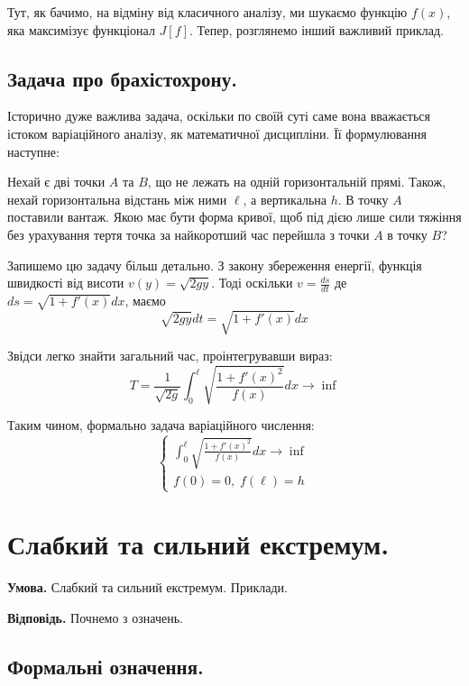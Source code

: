 \documentclass[14pt]{extarticle}
\newcommand{\<}{\langle}
\renewcommand{\>}{\rangle}
\theoremstyle{mystyle}{\newtheorem{definition}{Definition}[section]}
\theoremstyle{mystyle}{\newtheorem{proposition}[definition]{Proposition}}
\theoremstyle{mystyle}{\newtheorem{theorem}[definition]{Theorem}}
\theoremstyle{mystyle}{\newtheorem{lemma}[definition]{Lemma}}
\theoremstyle{mystyle}{\newtheorem{corollary}[definition]{Corollary}}
\theoremstyle{mystyle}{\newtheorem*{remark}{Remark}}
\theoremstyle{mystyle}{\newtheorem*{remarks}{Remarks}}
\theoremstyle{mystyle}{\newtheorem*{example}{Example}}
\theoremstyle{mystyle}{\newtheorem*{examples}{Examples}}
\theoremstyle{definition}{\newtheorem*{exercise}{Exercise}}
\theoremstyle{cstyle}{\newtheorem*{cthm}{}}
\theoremstyle{warn}
\begin{document}
Тут, як бачимо, на відміну від класичного аналізу, ми шукаємо функцію $f(x)$, яка максимізує функціонал $J[f]$.
Тепер, розглянемо інший важливий приклад.

\subsection{Задача про брахістохрону.}
Історично дуже важлива задача, оскільки по своїй суті 
саме вона вважається істоком варіаційного аналізу, як математичної дисципліни. Її формулювання наступне:

Нехай є дві точки $A$ та $B$, що не лежать на одній горизонтальній прямі. Також, нехай 
горизонтальна відстань між ними $\ell$, а вертикальна $h$. В точку $A$ поставили вантаж. Якою має бути 
форма кривої, щоб під дією лише сили тяжіння без урахування тертя точка за найкоротший
час перейшла з точки $A$ в точку $B$?

Запишемо цю задачу більш детально. З закону збереження енергії, функція швидкості
від висоти $v(y)=\sqrt{2gy}$. Тоді оскільки $v=\frac{ds}{dt}$ де $ds=\sqrt{1+f'(x)}dx$,
маємо 
\begin{equation}
    \sqrt{2gy}dt = \sqrt{1+f'(x)}dx
\end{equation}

Звідси легко знайти загальний час, проінтегрувавши вираз:
\begin{equation}
    T = \frac{1}{\sqrt{2g}}\int_0^{\ell}\sqrt{\frac{1+f'(x)^2}{f(x)}}dx \to \inf
\end{equation}

Таким чином, формально задача варіаційного числення:
\begin{equation}
    \begin{cases}
        \int_0^{\ell}\sqrt{\frac{1+f'(x)^2}{f(x)}}dx \to \inf \\
        f(0) = 0, \; f(\ell) = h
    \end{cases}
\end{equation}

\pagebreak
\section{Слабкий та сильний екстремум.}

\textbf{Умова.} Слабкий та сильний екстремум. Приклади.

\textbf{Відповідь.} Почнемо з означень.

\subsection{Формальні означення.}
\end{document}
